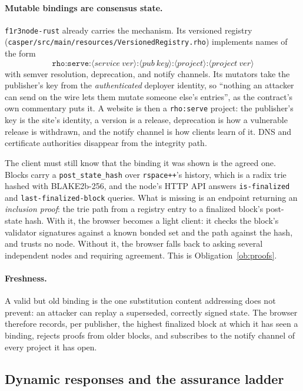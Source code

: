 \documentclass[11pt]{article}
\theoremstyle{definition}
\theoremstyle{remark}
\newcommand{\code}[1]{\texttt{#1}}
\begin{document}
\paragraph{Mutable bindings are consensus state.}
\code{f1r3node-rust} already carries the mechanism. Its versioned registry
(\code{casper/src/main/resources/VersionedRegistry.rho}) implements names of the form
\[
\code{rho:serve:}\langle\mathit{service\ ver}\rangle\code{:}\langle\mathit{pub\ key}\rangle\code{:}\langle\mathit{project}\rangle\code{:}\langle\mathit{project\ ver}\rangle
\]
with semver resolution, deprecation, and notify channels. Its mutators take the
publisher's key from the \emph{authenticated} deployer identity, so ``nothing an
attacker can send on the wire lets them mutate someone else's entries'', as the
contract's own commentary puts it. A website is then a \code{rho:serve} project: the
publisher's key is the site's identity, a version is a release, deprecation is how a
vulnerable release is withdrawn, and the notify channel is how clients learn of it.
DNS and certificate authorities disappear from the integrity path.

The client must still know that the binding it was shown is the agreed one. Blocks
carry a \code{post\_state\_hash} over \code{rspace++}'s history, which is a radix trie
hashed with BLAKE2b-256, and the node's HTTP API answers \code{is-finalized} and
\code{last-finalized-block} queries. What is missing is an endpoint returning an
\emph{inclusion proof}: the trie path from a registry entry to a finalized block's
post-state hash. With it, the browser becomes a light client: it checks the block's
validator signatures against a known bonded set and the path against the hash, and
trusts no node. Without it, the browser falls back to asking several independent nodes
and requiring agreement. This is Obligation~\ref{ob:proofs}.

\paragraph{Freshness.} A valid but old binding is the one substitution content
addressing does not prevent: an attacker can replay a superseded, correctly signed
state. The browser therefore records, per publisher, the highest finalized block at
which it has seen a binding, rejects proofs from older blocks, and subscribes to the
notify channel of every project it has open.

\subsection{Dynamic responses and the assurance ladder}
\end{document}
